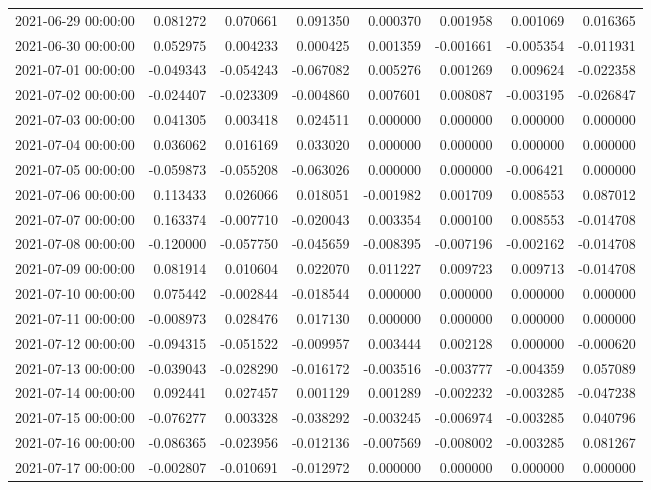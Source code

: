 \begin{tabular}{lrrrrrrr}
2021-06-29 00:00:00 & 0.081272 & 0.070661 & 0.091350 & 0.000370 & 0.001958 & 0.001069 & 0.016365 \\
2021-06-30 00:00:00 & 0.052975 & 0.004233 & 0.000425 & 0.001359 & -0.001661 & -0.005354 & -0.011931 \\
2021-07-01 00:00:00 & -0.049343 & -0.054243 & -0.067082 & 0.005276 & 0.001269 & 0.009624 & -0.022358 \\
2021-07-02 00:00:00 & -0.024407 & -0.023309 & -0.004860 & 0.007601 & 0.008087 & -0.003195 & -0.026847 \\
2021-07-03 00:00:00 & 0.041305 & 0.003418 & 0.024511 & 0.000000 & 0.000000 & 0.000000 & 0.000000 \\
2021-07-04 00:00:00 & 0.036062 & 0.016169 & 0.033020 & 0.000000 & 0.000000 & 0.000000 & 0.000000 \\
2021-07-05 00:00:00 & -0.059873 & -0.055208 & -0.063026 & 0.000000 & 0.000000 & -0.006421 & 0.000000 \\
2021-07-06 00:00:00 & 0.113433 & 0.026066 & 0.018051 & -0.001982 & 0.001709 & 0.008553 & 0.087012 \\
2021-07-07 00:00:00 & 0.163374 & -0.007710 & -0.020043 & 0.003354 & 0.000100 & 0.008553 & -0.014708 \\
2021-07-08 00:00:00 & -0.120000 & -0.057750 & -0.045659 & -0.008395 & -0.007196 & -0.002162 & -0.014708 \\
2021-07-09 00:00:00 & 0.081914 & 0.010604 & 0.022070 & 0.011227 & 0.009723 & 0.009713 & -0.014708 \\
2021-07-10 00:00:00 & 0.075442 & -0.002844 & -0.018544 & 0.000000 & 0.000000 & 0.000000 & 0.000000 \\
2021-07-11 00:00:00 & -0.008973 & 0.028476 & 0.017130 & 0.000000 & 0.000000 & 0.000000 & 0.000000 \\
2021-07-12 00:00:00 & -0.094315 & -0.051522 & -0.009957 & 0.003444 & 0.002128 & 0.000000 & -0.000620 \\
2021-07-13 00:00:00 & -0.039043 & -0.028290 & -0.016172 & -0.003516 & -0.003777 & -0.004359 & 0.057089 \\
2021-07-14 00:00:00 & 0.092441 & 0.027457 & 0.001129 & 0.001289 & -0.002232 & -0.003285 & -0.047238 \\
2021-07-15 00:00:00 & -0.076277 & 0.003328 & -0.038292 & -0.003245 & -0.006974 & -0.003285 & 0.040796 \\
2021-07-16 00:00:00 & -0.086365 & -0.023956 & -0.012136 & -0.007569 & -0.008002 & -0.003285 & 0.081267 \\
2021-07-17 00:00:00 & -0.002807 & -0.010691 & -0.012972 & 0.000000 & 0.000000 & 0.000000 & 0.000000 \\

\end{tabular}

